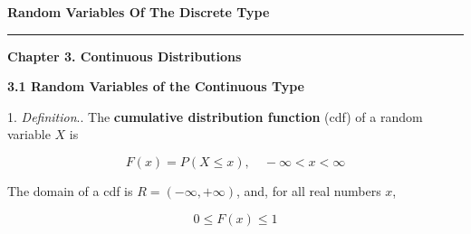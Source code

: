 \nopagenumbers
{\bf Random Variables Of The Discrete Type}
\vskip 1mm
\hrule

\vskip 6pt
\centerline{{\bf Chapter 3. Continuous Distributions}}

\vskip 1mm
{\bf 3.1 Random Variables of the Continuous Type}

\vskip 1mm
1. {\it Definition}.. The {\bf cumulative distribution function} (cdf) of a random variable $X$ is

$$F(x)=P(X\leq x),\quad -\infty<x<\infty$$

The domain of a cdf is $R=(-\infty,+\infty)$, and, for all real numbers $x$,

$$0\leq F(x)\leq 1$$

\filbreak







\filbreak


\vfill\eject
\bye
